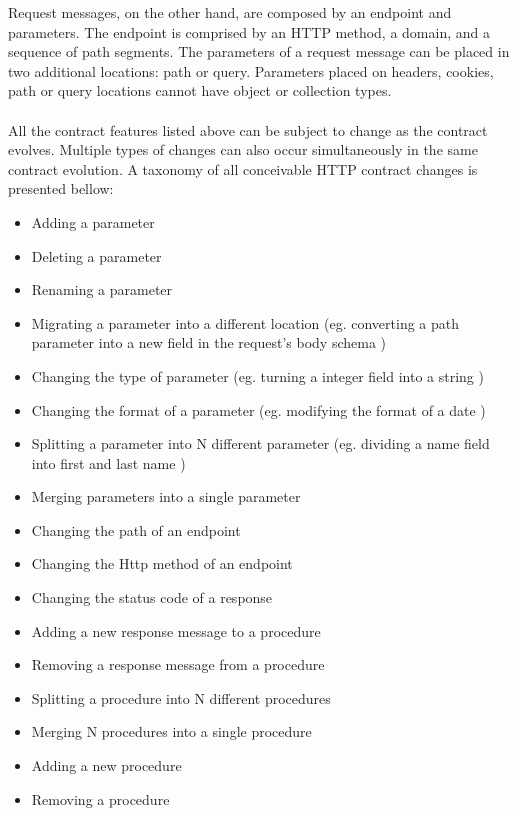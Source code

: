 Request messages, on the other hand, are composed by an endpoint and parameters.
The endpoint is comprised by an HTTP method, a domain, and a sequence of path segments.
The parameters of a request message can be placed in two additional locations: path or query.
Parameters placed on headers, cookies, path or query locations cannot have object or collection types.

\paragraph{}

All the contract features listed above can be subject to change as the contract evolves.
Multiple types of changes can also occur simultaneously in the same contract evolution.
A taxonomy of all conceivable HTTP contract changes is presented bellow:

\begin{itemize}
    \setlength\itemsep{0em}
    \item Adding a parameter
    \item Deleting a parameter
    \item Renaming a parameter
    \item Migrating a parameter into a different location (eg. converting a path parameter into a new field in the request's body schema )
    \item Changing the type of parameter (eg. turning a integer field into a string )
    \item Changing the format of a parameter (eg. modifying the format of a date )
    \item Splitting a parameter into N different parameter (eg. dividing a name field into first and last name )
    \item Merging parameters into a single parameter
    \item Changing the path of an endpoint
    \item Changing the Http method of an endpoint
    \item Changing the status code of a response
    \item Adding a new response message to a procedure
    \item Removing a response message from a procedure
    \item Splitting a procedure into N different procedures
    \item Merging N procedures into a single procedure
    \item Adding a new procedure
    \item Removing a procedure
\end{itemize}

